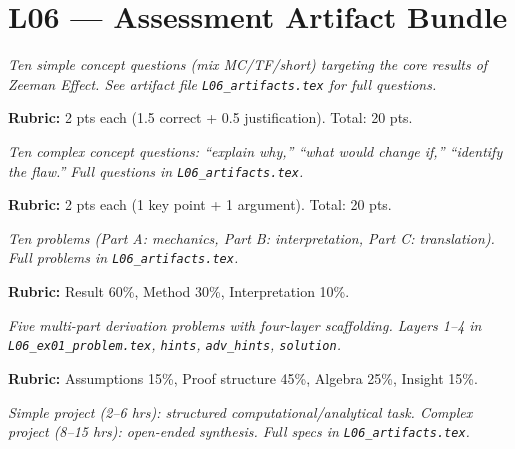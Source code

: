 \newpage
\section*{L06 — Assessment Artifact Bundle}

\begin{tcolorbox}[ugconceptbox, title={SCQU · L06 · Tiers 1–3 · 15–20 min}]
\textit{Ten simple concept questions (mix MC/TF/short) targeting the core results
of Zeeman Effect. See artifact file \texttt{L06_artifacts.tex} for full questions.}

\textbf{Rubric:} 2 pts each (1.5 correct + 0.5 justification). Total: 20 pts.
\end{tcolorbox}

\begin{tcolorbox}[ugconceptbox, title={CCQU · L06 · Tiers 2–3 · 25–35 min}]
\textit{Ten complex concept questions: ``explain why,'' ``what would change if,''
``identify the flaw.'' Full questions in \texttt{L06_artifacts.tex}.}

\textbf{Rubric:} 2 pts each (1 key point + 1 argument). Total: 20 pts.
\end{tcolorbox}

\begin{tcolorbox}[ugprobbox, title={SPSU · L06 · Tiers 1–3 · 60–90 min}]
\textit{Ten problems (Part A: mechanics, Part B: interpretation, Part C: translation).
Full problems in \texttt{L06_artifacts.tex}.}

\textbf{Rubric:} Result 60\%, Method 30\%, Interpretation 10\%.
\end{tcolorbox}

\begin{tcolorbox}[ugprobbox, title={CPSU · L06 · Tier 3 · 3–6 hrs (4-layer)}]
\textit{Five multi-part derivation problems with four-layer scaffolding.
Layers 1–4 in \texttt{L06_ex01\_problem.tex}, \texttt{hints}, \texttt{adv\_hints}, \texttt{solution}.}

\textbf{Rubric:} Assumptions 15\%, Proof structure 45\%, Algebra 25\%, Insight 15\%.
\end{tcolorbox}

\begin{tcolorbox}[ugprobbox, title={SPJU + CPJU · L06 · Tiers 2–3}]
\textit{Simple project (2–6 hrs): structured computational/analytical task.
Complex project (8–15 hrs): open-ended synthesis.
Full specs in \texttt{L06_artifacts.tex}.}
\end{tcolorbox}

